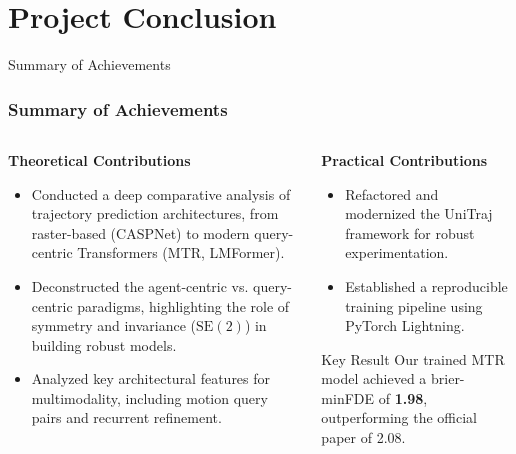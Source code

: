 \documentclass[10pt,aspectratio=169]{beamer}
\begin{document}
\section{Project Conclusion}

\begin{frame}{Summary of Achievements}
    \frametitle{Summary of Achievements}
    \begin{columns}[T]
        \begin{column}{0.6\textwidth}
            \textbf{Theoretical Contributions}
            \begin{itemize}
                \item Conducted a deep comparative analysis of trajectory prediction architectures, from raster-based (CASPNet) to modern query-centric Transformers (MTR, LMFormer).
                \item Deconstructed the agent-centric vs. query-centric paradigms, highlighting the role of symmetry and invariance ($\mathrm{SE}(2)$) in building robust models.
                \item Analyzed key architectural features for multimodality, including motion query pairs and recurrent refinement.
            \end{itemize}
        \end{column}
        \begin{column}{0.4\textwidth}
            \textbf{Practical Contributions}
            \begin{itemize}
                \item Refactored and modernized the UniTraj framework for robust experimentation.
                \item Established a reproducible training pipeline using PyTorch Lightning.
            \end{itemize}
            \begin{alertblock}{Key Result}
                Our trained MTR model achieved a brier-minFDE of \textbf{1.98}, outperforming the official paper of 2.08.
            \end{alertblock}
        \end{column}
    \end{columns}
\end{frame}

\end{document}
